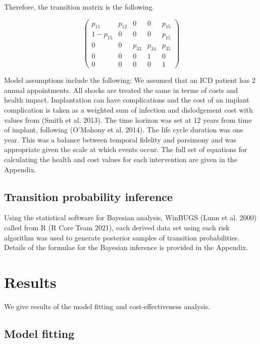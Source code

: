 \documentclass[
]{article}
\begin{document}
Therefore, the transition matrix is the following.

\[
\begin{pmatrix}
p_{11} & p_{12} & 0 & 0 & p_{15}\\
1 - p_{15} & 0 & 0 & 0 & p_{15}\\
0 & 0 & p_{33} & p_{34} & p_{35}\\
0 & 0 & 0 & 1 & 0\\
0 & 0 & 0 & 0 & 1
\end{pmatrix}
\]

Model assumptions include the following: We assumed that an ICD patient
has 2 annual appointments. All shocks are treated the same in terms of
costs and health impact. Implantation can have complications and the
cost of an implant complication is taken as a weighted sum of infection
and dislodgement cost with values from (Smith et al. 2013). The time
horizon was set at 12 years from time of implant, following (O'Mahony et
al. 2014). The life cycle duration was one year. This was a balance
between temporal fidelity and parsimony and was appropriate given the
scale at which events occur. The full set of equations for calculating
the health and cost values for each intervention are given in the
Appendix.

\hypertarget{transition-probability-inference}{%
\subsection{Transition probability
inference}\label{transition-probability-inference}}

Using the statistical software for Bayesian analysis, WinBUGS (Lunn et
al. 2000) called from R (R Core Team 2021), each derived data set using
each risk algorithm was used to generate posterior samples of transition
probabilities. Details of the formulae for the Bayesian inference is
provided in the Appendix.

\hypertarget{results}{%
\section{Results}\label{results}}

We give results of the model fitting and cost-effectiveness analysis.

\hypertarget{model-fitting}{%
\subsection{Model fitting}\label{model-fitting}}
\end{document}
